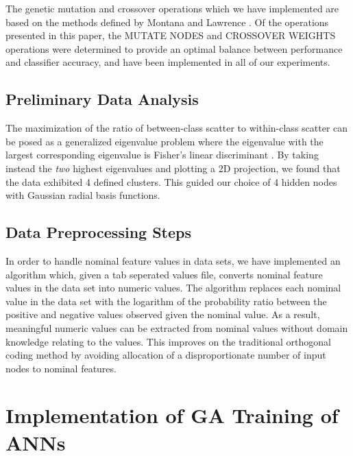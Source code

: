 \documentclass[11pt]{article}       %
\begin{document}
The genetic mutation and crossover operations which we have implemented are based on the methods defined by Montana and Lawrence \cite{GA-ANN}. Of the operations presented in this paper, the MUTATE NODES and CROSSOVER WEIGHTS operations were determined to provide an optimal balance between performance and classifier accuracy, and have been implemented in all of our experiments.

\subsection{Preliminary Data Analysis} \label{prelim}
The maximization of the ratio of between-class scatter to within-class scatter can be posed as a generalized eigenvalue problem where the eigenvalue with the largest corresponding eigenvalue is Fisher's linear discriminant \cite[\S 3.8.2]{Duda}. By taking instead the \emph{two} highest eigenvalues and plotting a 2D projection, we found that the data exhibited 4 defined clusters. This  guided our choice of 4 hidden nodes with Gaussian radial basis functions.

\subsection{Data Preprocessing Steps} \label{preprocessing}
In order to handle nominal feature values in data sets, we have implemented an algorithm which, given a tab seperated values file, converts nominal feature values in the data set into numeric values.  The algorithm replaces each nominal value in the data set with the logarithm of the probability ratio between the positive and negative values observed given the nominal value.  As a result, meaningful numeric values can be extracted from nominal values without domain knowledge relating to the values. This improves on the traditional orthogonal coding method \cite[slide 17]{MLP-NominalCoding} by avoiding allocation of a disproportionate number of input nodes to nominal features.

\section{Implementation of GA Training of ANNs} \label{algimp}
\end{document}
